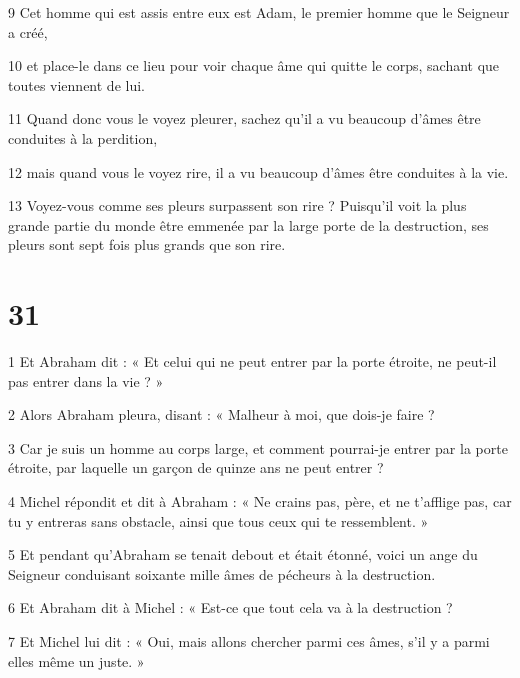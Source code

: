 \par 9 Cet homme qui est assis entre eux est Adam, le premier homme que le Seigneur a créé,

\par 10 et place-le dans ce lieu pour voir chaque âme qui quitte le corps, sachant que toutes viennent de lui.

\par 11 Quand donc vous le voyez pleurer, sachez qu'il a vu beaucoup d'âmes être conduites à la perdition,

\par 12 mais quand vous le voyez rire, il a vu beaucoup d'âmes être conduites à la vie.

\par 13 Voyez-vous comme ses pleurs surpassent son rire ? Puisqu’il voit la plus grande partie du monde être emmenée par la large porte de la destruction, ses pleurs sont sept fois plus grands que son rire.

\chapter{31}

\par 1 Et Abraham dit : « Et celui qui ne peut entrer par la porte étroite, ne peut-il pas entrer dans la vie ? »

\par 2 Alors Abraham pleura, disant : « Malheur à moi, que dois-je faire ?

\par 3 Car je suis un homme au corps large, et comment pourrai-je entrer par la porte étroite, par laquelle un garçon de quinze ans ne peut entrer ?

\par 4 Michel répondit et dit à Abraham : « Ne crains pas, père, et ne t'afflige pas, car tu y entreras sans obstacle, ainsi que tous ceux qui te ressemblent. »

\par 5 Et pendant qu'Abraham se tenait debout et était étonné, voici un ange du Seigneur conduisant soixante mille âmes de pécheurs à la destruction.

\par 6 Et Abraham dit à Michel : « Est-ce que tout cela va à la destruction ?

\par 7 Et Michel lui dit : « Oui, mais allons chercher parmi ces âmes, s'il y a parmi elles même un juste. »

